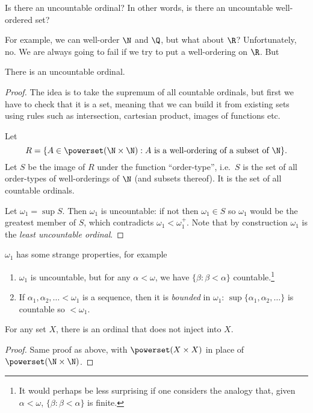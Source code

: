 \documentclass[a4paper]{article}
\begin{document}
Is there an uncountable ordinal? In other words, is there an uncountable well-ordered set?

For example, we can well-order \(\N\) and \(\Q\), but what about \(\R\)? Unfortunately, no. We are always going to fail if we try to put a well-ordering on \(\R\). But

\begin{theorem}
  There is an uncountable ordinal.
\end{theorem}

\begin{proof}
  The idea is to take the supremum of all countable ordinals, but first we have to check that it is a set, meaning that we can build it from existing sets using rules such as intersection, cartesian product, images of functions etc.

  Let
  \[
    R = \{A \in \powerset(\N \times \N): A \text{ is a well-ordering of a subset of } \N\}.
  \]
  Let \(S\) be the image of \(R\) under the function ``order-type'', i.e.\ \(S\) is the set of all order-types of well-orderings of \(\N\) (and subsets thereof). It is the set of all countable ordinals.

  Let \(\omega_1 = \sup S\). Then \(\omega_1\) is uncountable: if not then \(\omega_1 \in S\) so \(\omega_1\) would be the greatest member of \(S\), which contradicts \(\omega_1 < \omega_1^+\). Note that by construction \(\omega_1\) is the \emph{least uncountable ordinal}.
\end{proof}

\(\omega_1\) has some strange properties, for example
\begin{enumerate}
\item \(\omega_1\) is uncountable, but for any \(\alpha < \omega\), we have \(\{\beta: \beta < \alpha\}\) countable.\footnote{It would perhaps be less surprising if one considers the analogy that, given \(\alpha < \omega\), \(\{\beta: \beta < \alpha\}\) is finite.}
\item If \(\alpha_1, \alpha_2, \dots < \omega_1\) is a sequence, then it is \emph{bounded} in \(\omega_1\): \(\sup\{\alpha_1, \alpha_2, \dots\}\) is countable so \(< \omega_1\).
\end{enumerate}

\begin{theorem}
  For any set \(X\), there is an ordinal that does not inject into \(X\).
\end{theorem}

\begin{proof}
  Same proof as above, with \(\powerset(X \times X)\) in place of \(\powerset(\N \times \N)\).
\end{proof}
\end{document}
